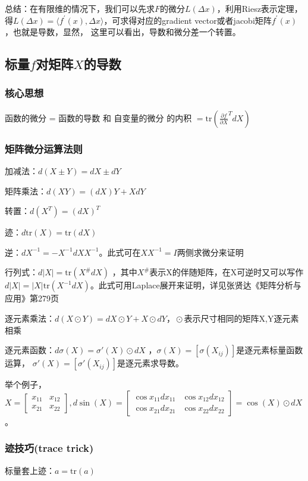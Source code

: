 \documentclass[UTF8]{ctexart}
\begin{document}
		总结：在有限维的情况下，我们可以先求$F$的微分$L(\Delta x)$，利用Riesz表示定理，得$L(\Delta x) = \langle f^{'}(x) , \Delta x \rangle$，可求得对应的gradient vector或者jacobi矩阵$f^{'}(x)$，也就是导数，显然， 这里可以看出，导数和微分差一个转置。

	\subsection*{标量$f$对矩阵$X$的导数}
		\subsubsection*{核心思想}
		函数的微分 = 函数的导数 和 自变量的微分 的内积 $= \text{tr}\left(\frac{\partial f}{\partial X}^T dX\right)$
		\subsubsection*{矩阵微分运算法则}
		加减法：$d(X\pm Y) = dX \pm dY$

		矩阵乘法：$d(XY) = (dX)Y + X dY$ 

		转置：$d(X^T) = (dX)^T$

		迹：$d\text{tr}(X) = \text{tr}(dX)$

		逆：$dX^{-1} = -X^{-1}dX X^{-1}$。此式可在$XX^{-1}=I$两侧求微分来证明

		行列式：$d|X| = \text{tr}(X^{\#}dX)$ ，其中$X^{\#}$表示X的伴随矩阵，在X可逆时又可以写作$d|X|= |X|\text{tr}(X^{-1}dX)$。此式可用Laplace展开来证明，详见张贤达《矩阵分析与应用》第279页

		逐元素乘法：$d(X\odot Y) = dX\odot Y + X\odot dY，\odot$表示尺寸相同的矩阵X,Y逐元素相乘

		逐元素函数：$d\sigma(X) = \sigma'(X)\odot dX$ ，$\sigma(X) = \left[\sigma(X_{ij})\right]$是逐元素标量函数运算， $\sigma'(X)=[\sigma'(X_{ij})]$是逐元素求导数。

		举个例子，
		$X =
		\left[\begin{matrix}
		x_{11} & x_{12} \\
		x_{21} & x_{22}
		\end{matrix}\right], 
		d \sin(X) = 
		\left[\begin{matrix}\cos x_{11} dx_{11} & \cos x_{12} d x_{12}\\ 
		\cos x_{21} d x_{21}& \cos x_{22} dx_{22}
		\end{matrix}\right] =
		\cos(X)\odot dX$。


		\subsubsection*{迹技巧(trace trick)}
		标量套上迹：$a = \text{tr}(a)$
\end{document}
